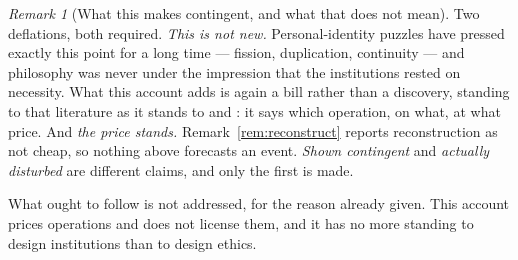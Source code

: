 \documentclass[11pt,a4paper]{article}
\theoremstyle{remark}
\newtheorem{remark}[definition]{Remark}
\begin{document}
\begin{remark}[What this makes contingent, and what that does not mean]
Two deflations, both required. \emph{This is not new.} Personal-identity puzzles have pressed exactly
this point for a long time --- fission, duplication, continuity --- and philosophy was never under the
impression that the institutions rested on necessity. What this account adds is again a bill rather
than a discovery, standing to that literature as it stands to \citet{turing1950} and
\citet{putnam1967}: it says which operation, on what, at what price. And \emph{the price stands.}
Remark~\ref{rem:reconstruct} reports reconstruction as not cheap, so nothing above forecasts an event.
\emph{Shown contingent} and \emph{actually disturbed} are different claims, and only the first is made.

What ought to follow is not addressed, for the reason already given. This account prices operations and
does not license them, and it has no more standing to design institutions than to design ethics.
\end{remark}
\end{document}
